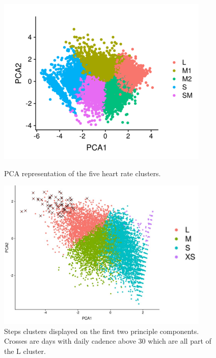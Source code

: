 \documentclass{article}
\begin{document}
\begin{figure}
    \centering
    \begin{minipage}{0.45\textwidth}
        \centering
        \includegraphics[width=0.9\textwidth]{HRclusters.png} %
        \caption{PCA representation of the five heart rate clusters.}
        \label{fig:HRclusters}
    \end{minipage}\hfill
    \begin{minipage}{0.45\textwidth}
        \centering
        \includegraphics[width=0.9\textwidth]{FitbitClusterValidation.jpg} %
        \caption{Steps clusters displayed on the first two principle components. Crosses are days with daily cadence above 30 which are all part of the L cluster.}
 \label{fig:FitbitClusterValidation}
    \end{minipage}
\end{figure}
\end{document}
